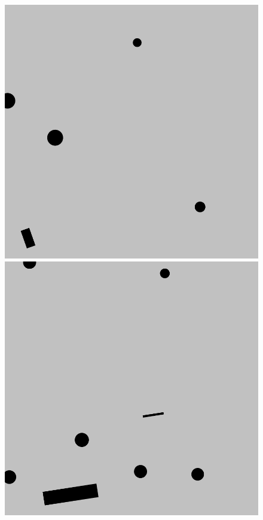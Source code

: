 \documentclass{beamer}
\begin{document}
\begin{frame}
\begin{figure}[H]
\begin{columns}
						\begin{column}{0.14\textwidth}
							\includegraphics[width=1\linewidth]{graphics/test_model_05_5.png}
							\includegraphics[width=1\linewidth]{graphics/test_model_08_5.png}

\end{column}
\end{columns}
\end{figure}
\end{frame}
\end{document}
